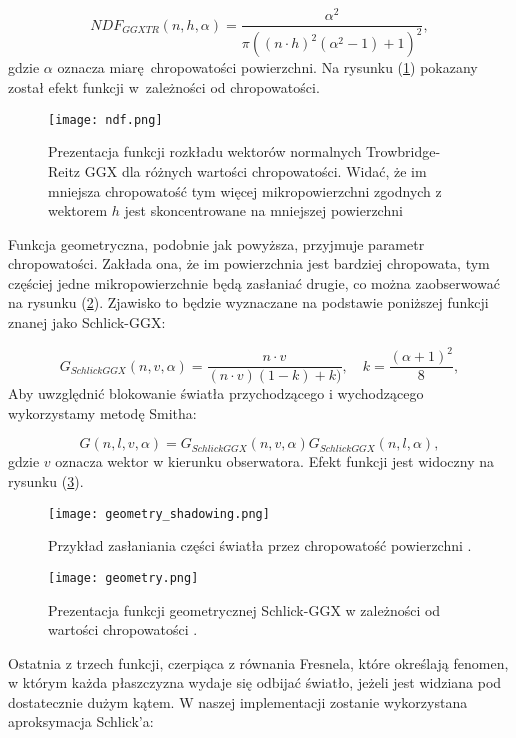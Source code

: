 $$
NDF_{GGXTR}(n,h,\alpha) = \frac{\alpha^2}{\pi\left( (n\cdot h)^2 (\alpha^2 - 1) + 1 \right)^2 },
$$
gdzie $\alpha$ oznacza miarę chropowatości powierzchni. Na rysunku (\ref{normaldistribution}) pokazany został efekt funkcji w~zależności od chropowatości.


\begin{figure}[h]
	\centering
	\texttt{[image: ndf.png]}
	\caption{Prezentacja funkcji rozkładu wektorów normalnych Trowbridge-Reitz GGX dla różnych wartości chropowatości. Widać, że im mniejsza chropowatość tym więcej mikropowierzchni zgodnych z wektorem $h$ jest skoncentrowane na mniejszej powierzchni}
	\label{normaldistribution}
\end{figure}

Funkcja geometryczna, podobnie jak powyższa, przyjmuje parametr chropowatości. Zakłada ona, że im powierzchnia jest bardziej chropowata, tym częściej jedne mikropowierzchnie będą zasłaniać drugie, co można zaobserwować na rysunku (\ref{geometry_shadowing}). Zjawisko to będzie wyznaczane na podstawie poniższej funkcji znanej jako Schlick-GGX:

$$
G_{SchlickGGX}(n,v,\alpha) = \frac{n \cdot v}{(n\cdot v)(1-k) + k)}, \hspace{1em} k = \frac{(\alpha+1)^2}{8},
$$
Aby uwzględnić blokowanie światła przychodzącego i wychodzącego wykorzystamy metodę Smitha:

$$
G(n, l, v, \alpha)  = G_{SchlickGGX}(n,v,\alpha)G_{SchlickGGX}(n,l,\alpha),
$$
gdzie $v$ oznacza wektor w kierunku obserwatora. Efekt funkcji jest widoczny na rysunku (\ref{geometry}).

\begin{figure}[h]
	\centering
	\texttt{[image: geometry\_shadowing.png]}
	\caption{Przykład zasłaniania części światła przez chropowatość powierzchni \cite{learnopengl}.}
	\label{geometry_shadowing}
\end{figure}


\begin{figure}[h]
	\centering
	\texttt{[image: geometry.png]}
	\caption{Prezentacja funkcji geometrycznej Schlick-GGX w zależności od wartości chropowatości \cite{learnopengl}.}
	\label{geometry}
\end{figure}

Ostatnia z trzech funkcji, czerpiąca z równania Fresnela, które określają fenomen, w którym każda płaszczyzna wydaje się odbijać światło, jeżeli jest widziana pod dostatecznie dużym kątem. W naszej implementacji zostanie wykorzystana aproksymacja Schlick'a:

